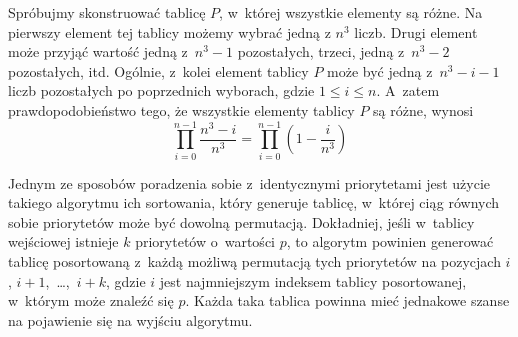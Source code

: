 \exercise %
Spróbujmy skonstruować tablicę $P$, w~której wszystkie elementy są różne. Na pierwszy element tej tablicy możemy wybrać jedną z $n^3$ liczb. Drugi element może przyjąć wartość jedną z~$n^3-1$ pozostałych, trzeci, jedną z~$n^3-2$ pozostałych, itd. Ogólnie,  z~kolei element tablicy $P$ może być jedną z~$n^3-i-1$ liczb pozostałych po poprzednich wyborach, gdzie $1\le i\le n$. A~zatem prawdopodobieństwo tego, że wszystkie elementy tablicy $P$ są różne, wynosi
\[
	\prod_{i=0}^{n-1}\frac{n^3-i}{n^3} = \prod_{i=0}^{n-1}\left(1-\frac{i}{n^3}\right)
\]



\exercise %
Jednym ze sposobów poradzenia sobie z~identycznymi priorytetami jest użycie takiego algorytmu ich sortowania, który generuje tablicę, w~której ciąg równych sobie priorytetów może być dowolną permutacją. Dokładniej, jeśli w~tablicy wejściowej istnieje $k$ priorytetów o~wartości $p$, to algorytm powinien generować tablicę posortowaną z~każdą możliwą permutacją tych priorytetów na pozycjach $i$, $i+1$,~\dots,~$i+k$, gdzie $i$ jest najmniejszym indeksem tablicy posortowanej, w~którym może znaleźć się $p$. Każda taka tablica powinna mieć jednakowe szanse na pojawienie się na wyjściu algorytmu.

